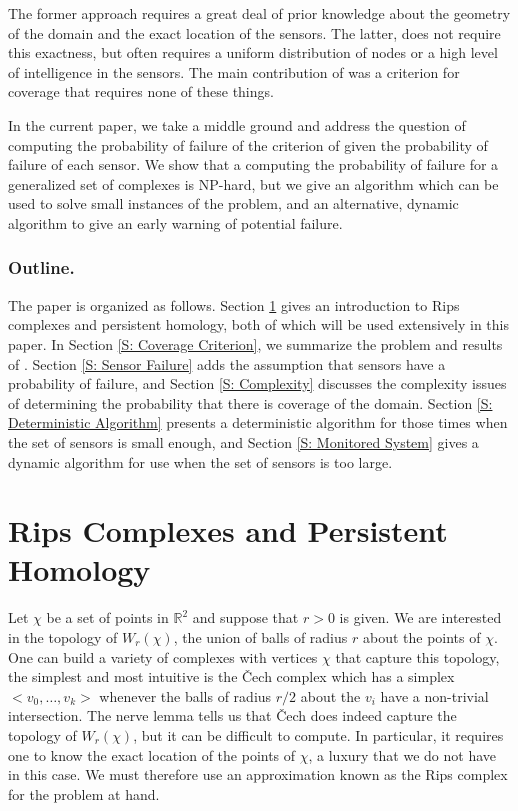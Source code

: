 \documentclass[10pt,twocolumn]{article} \usepackage{amsmath,epsf,amssymb,cite,pifont,amsthm, mathrsfs,epsfig,  bbm, amsthm,  setspace}
\newcommand{\R}{\mathbb R}
\renewcommand{\1}{\mathbbm{1}}
\newcommand{\Cech}{\v{C}ech }
\begin{document}
The former approach
requires a great deal of prior knowledge about the geometry of the domain and the exact location of the sensors.
The latter,
does not require this exactness, but often requires a uniform distribution of nodes or a high level
of intelligence in the
sensors.
The main contribution of  \cite{DeSilva2006} was a criterion for
coverage that  requires none of these things.


In the current paper, we take a middle ground and address  the question of computing  the probability of failure of
the criterion of \cite{DeSilva2006} given the probability of failure of each sensor.
We  show that a computing the probability of failure for a generalized set of complexes is   NP-hard, 
but we give an algorithm which can be used to solve small instances of the problem,
and an alternative, dynamic algorithm to give an early warning of potential failure.



\subsubsection*{Outline. }
The paper is organized as follows.
Section \ref{S: Persistent Homology} gives an introduction to Rips complexes and persistent homology,
both of which will be used extensively in this paper.
In Section \ref{S: Coverage Criterion}, we  summarize the problem and results of \cite{DeSilva2006}.
Section \ref{S: Sensor Failure} adds the assumption that sensors have a probability of failure, and Section
\ref{S: Complexity} discusses the complexity issues of determining the probability that there is coverage of
the domain.
Section \ref{S: Deterministic Algorithm} presents a deterministic algorithm for those times when
the set of sensors is small enough, and Section \ref{S: Monitored System} gives a
dynamic algorithm for use when the set of sensors is too large.


\section{Rips Complexes and Persistent Homology}\label{S: Persistent Homology}

Let $\chi$ be a set of points in $\R^2$ and suppose that $r>0$ is given.
We are interested in the topology of $W_r(\chi)$, the union of balls of radius $r$ about the points
of $\chi$.
One can build a variety of complexes with vertices $\chi$ that capture this topology,
the simplest and most intuitive is the \Cech complex which has a simplex
$<v_0, \ldots, v_k>$ whenever the balls of radius $r/2$ about the $v_i$ have a non-trivial
intersection.
The nerve lemma tells us that \Cech does indeed capture the topology of $W_r(\chi)$,
but it can be difficult to compute.
In particular, it requires one to know the exact location of the points of $\chi$, a luxury
that we do not have in this case.
We must therefore use an approximation known as the Rips complex for the problem
at hand.
\end{document}
